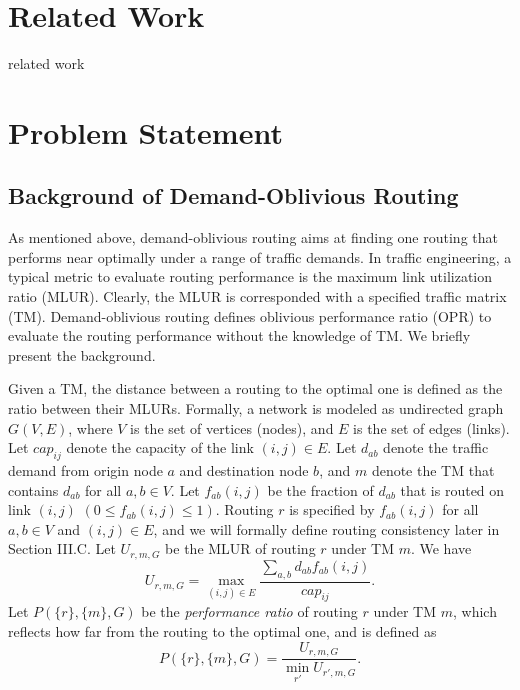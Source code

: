 \documentclass[conference]{IEEEtran}
\begin{document}
\section{Related Work}
related work

\section{Problem Statement}

\subsection{Background of Demand-Oblivious Routing}

As mentioned above, demand-oblivious routing aims at finding one routing that performs near optimally under a range of traffic demands. In traffic engineering, a typical metric to evaluate routing performance is the maximum link utilization ratio (MLUR). Clearly, the MLUR is corresponded with a specified traffic matrix (TM). Demand-oblivious routing defines oblivious performance ratio (OPR) to evaluate the routing performance without the knowledge of TM. We briefly present the background.

Given a TM, the distance between a routing to the optimal one is defined as the ratio between their MLURs. Formally, a network is modeled as undirected graph $G(V, E)$, where $V$ is the set of vertices (nodes), and $E$ is the set of edges (links). Let $cap_{ij}$ denote the capacity of the link $(i, j) \in E$. Let $d_{ab}$ denote the traffic demand from origin node $a$ and destination node $b$, and $m$ denote the TM that contains $d_{ab}$ for all $a, b \in V$. Let $f_{ab}(i,j)$ be the fraction of $d_{ab}$ that is routed on link $(i, j)$ $(0 \leq f_{ab}(i,j) \leq 1)$. Routing $r$ is specified by $f_{ab}(i,j)$ for all $a, b \in V$ and $(i, j) \in E$, and we will formally define routing consistency later in Section III.C. Let $U_{r, m, G}$ be the MLUR of routing $r$ under TM $m$. We have
\begin{equation}
	U_{r, m, G} = \max_{(i,j)\in E} \frac{\sum_{a,b} d_{ab}f_{ab}(i,j)}{cap_{ij}}.
\end{equation}
Let $P(\{ r \},\{ m \}, G)$ be the \emph{performance ratio} of routing $r$ under TM $m$, which reflects how far from the routing to the optimal one, and is defined as
\begin{equation}
	P(\{ r \},\{ m \}, G) = \frac{U_{r,m,G}}{\min_{r'} U_{r', m, G}}.
\end{equation}
\end{document}
